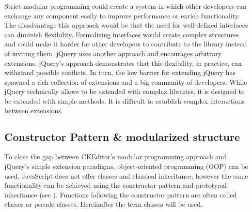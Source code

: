 Strict modular programming could create a system in which other developers can exchange any component easily to improve performance or enrich functionality. The disadvantage this approach would be that the need for well-defined interfaces can diminish flexibility. Formalizing interfaces would create complex structures and could make it harder for other developers to contribute to the library instead of inviting them. jQuery uses another approach and encourages arbitrary extensions. jQuery's approach demonstrates that this flexibility, in practice, can withstand possible conflicts. In turn, the low barrier for extending jQuery has spawned a rich collection of extensions and a big community of developers. While jQuery technically allows to be extended with complex libraries, it is designed to be extended with simple methods. It is difficult to establish complex interactions between extensions.



\subsection{Constructor Pattern \& modularized structure}
\label{subsec:const_pat_and_modules}

To close the gap between CKEditor's modular programming approach and jQuery's simple extension paradigms, object-oriented programming (OOP) can be used. JavaScript does not offer classes and classical inheritance, however the same functionality can be achieved using the constructor pattern and prototypal inheritance (see ). Functions following the constructor pattern are often called classes or pseudo-classes. Hereinafter the term classes will be used.

%
%
%




